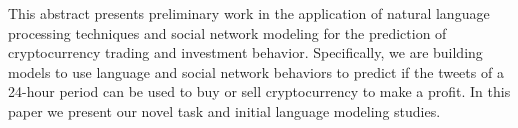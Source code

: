 This abstract presents preliminary work in the application of natural language processing techniques and social network modeling for the prediction of cryptocurrency trading and investment behavior. Specifically, we are building models to use language and social network behaviors to predict if the tweets of a 24-hour period can be used to buy or sell cryptocurrency to make a profit. In this paper we present our novel task and initial language modeling studies.
